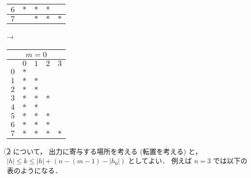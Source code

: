 \documentclass{jsarticle}
\newcommand{\abs}[1]{\lvert #1 \rvert}
\begin{document}
\begin{center}
\begin{tabular}{|l|c|c|c|c|}
    $6$ & $*$ & $*$ & $*$ &     \\\hline
    $7$ &     & $*$ & $*$ & $*$ \\\hline
  \end{tabular}
  →\
  \begin{tabular}{|l|c|c|c|c|}\hline
    \multicolumn{5}{|c|}{$m=0$} \\\hline
        & $0$ & $1$ & $2$ & $3$ \\\hline
    $0$ & $*$ &     &     &     \\\hline
    $1$ & $*$ & $*$ &     &     \\\hline
    $2$ & $*$ & $*$ &     &     \\\hline
    $3$ & $*$ & $*$ & $*$ &     \\\hline
    $4$ & $*$ & $*$ &     &     \\\hline
    $5$ & $*$ & $*$ & $*$ &     \\\hline
    $6$ & $*$ & $*$ & $*$ &     \\\hline
    $7$ & $*$ & $*$ & $*$ & $*$ \\\hline
  \end{tabular}
\end{center}

\textcircled{2} について，
出力に寄与する場所を考える (転置を考える) と，
$\abs{h} \le k \le \abs{h} + (n - (m-1) - \abs{h_0})$ としてよい．
例えば $n = 3$ では以下の表のようになる．
\end{document}
